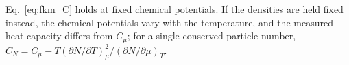 \documentclass[10pt,a4paper]{article}
\theoremstyle{plain}
\begin{document}
Eq.~\eqref{eq:fkm_C} holds at fixed chemical potentials. If the densities
are held fixed instead, the chemical potentials vary with the temperature,
and the measured heat capacity differs from $C_\mu$; for a single conserved
particle number,
$C_N=C_\mu-T(\partial N/\partial T)_\mu^{2}/(\partial N/\partial\mu)_T$.



\end{document}
